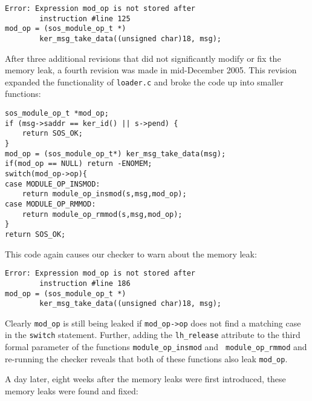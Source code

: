 \begin{scriptsize}
\begin{verbatim}
Error: Expression mod_op is not stored after 
        instruction #line 125
mod_op = (sos_module_op_t *)
        ker_msg_take_data((unsigned char)18, msg);
\end{verbatim}
\end{scriptsize}



After three additional revisions that did not significantly modify or fix
the memory leak, a fourth revision was made in mid-December 2005.
%
This revision expanded the functionality of {\tt loader.c} and broke the
code up into smaller functions:



\begin{scriptsize}
\begin{verbatim}
sos_module_op_t *mod_op;
if (msg->saddr == ker_id() || s->pend) {
    return SOS_OK;
}
mod_op = (sos_module_op_t*) ker_msg_take_data(msg);
if(mod_op == NULL) return -ENOMEM;
switch(mod_op->op){
case MODULE_OP_INSMOD:
    return module_op_insmod(s,msg,mod_op);
case MODULE_OP_RMMOD:
    return module_op_rmmod(s,msg,mod_op);
}
return SOS_OK;
\end{verbatim}
\end{scriptsize}



This code again causes our checker to warn about the memory leak:



\begin{scriptsize}
\begin{verbatim}
Error: Expression mod_op is not stored after 
        instruction #line 186
mod_op = (sos_module_op_t *)
        ker_msg_take_data((unsigned char)18, msg);
\end{verbatim}
\end{scriptsize}



Clearly {\tt mod\_op} is still being leaked if {\tt mod\_op->op} does not
find a matching case in the {\tt switch} statement.  
%
Further, adding the {\tt lh\_release} attribute to the third formal
parameter of the functions {\tt module\_op\_insmod} and {\tt
module\_op\_rmmod} and re-running the checker reveals that both of these
functions also leak {\tt mod\_op}.



A day later, eight weeks after the memory leaks were first introduced,
these memory leaks were found and fixed:



